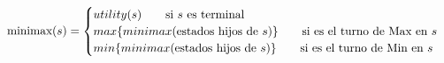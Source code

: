 \documentclass[preview]{standalone}
\begin{document}
\begin{align*}
\text{minimax($s$)} =  \begin{cases}
                                 utility(s) \qquad \text{si $s$ es terminal} \cr
                                 max\{minimax(\text{estados hijos de $s$})\}\qquad \text{si es el turno de Max en $s$} \cr
                                 min\{minimax(\text{estados hijos de $s$})\}\qquad \text{si es el turno de Min en $s$} \cr
                                 \end{cases}
\end{align*}
\end{document}
